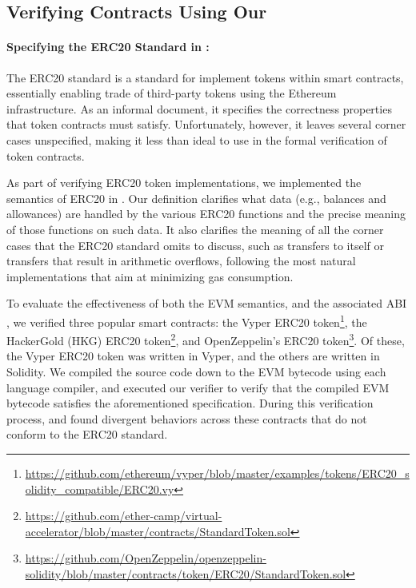\subsection{Verifying Contracts Using Our \DSL{}}\label{sec:verifying-contracts-dsl}

\paragraph{Specifying the ERC20 Standard in \K{}:}
The ERC20 standard \cite{ERC20Url} is a standard for implement tokens within
smart contracts, essentially enabling trade of third-party tokens using the
Ethereum infrastructure.
As an informal document, it specifies the correctness properties that
token contracts must satisfy.
Unfortunately, however, it leaves several corner cases unspecified,
making it less than ideal to use in the formal verification of token contracts. %

As part of verifying ERC20 token implementations, we implemented the semantics
of ERC20 in \K{}. Our definition
clarifies what data
(e.g., balances and allowances) are handled by the various ERC20 functions
and the precise meaning of those functions on such data.
It also clarifies the meaning of all the corner cases that the ERC20 standard omits to discuss,
such as transfers to itself or transfers that result in arithmetic overflows,
following the most natural implementations that aim at minimizing gas consumption.

To evaluate the effectiveness of both the EVM semantics, and the
associated ABI \DSL{}, we verified three popular smart contracts:
the Vyper ERC20 token\footnote{\url{https://github.com/ethereum/vyper/blob/master/examples/tokens/ERC20_solidity_compatible/ERC20.vy}},
the HackerGold (HKG) ERC20 token\footnote{\url{https://github.com/ether-camp/virtual-accelerator/blob/master/contracts/StandardToken.sol}},
and OpenZeppelin's ERC20 token\footnote{\url{https://github.com/OpenZeppelin/openzeppelin-solidity/blob/master/contracts/token/ERC20/StandardToken.sol}}.
Of these, the Vyper ERC20 token was written in Vyper, and the others are written in Solidity.
We compiled the source code down to the EVM bytecode using each language compiler,
and executed our verifier to verify that the compiled EVM bytecode satisfies the aforementioned specification.
During this verification process, and found divergent behaviors across these contracts that do not conform to the ERC20 standard.

